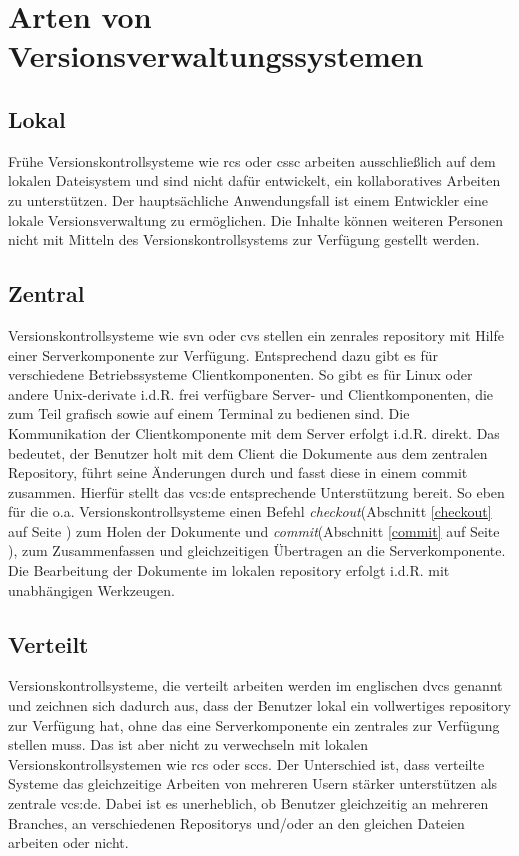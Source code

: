 \section{Arten von Versionsverwaltungssystemen}
\subsection{Lokal}\label{sec:local}
Frühe Versionskontrollsysteme wie \acrshort{rcs} oder \acrshort{cssc} arbeiten
ausschließlich auf dem lokalen Dateisystem und sind nicht dafür entwickelt, ein
kollaboratives Arbeiten zu unterstützen. Der hauptsächliche Anwendungsfall ist
einem Entwickler eine lokale Versionsverwaltung zu ermöglichen. Die Inhalte
können weiteren Personen nicht mit Mitteln des Versionskontrollsystems zur
Verfügung gestellt werden.

\subsection{Zentral}\label{sec:central}
Versionskontrollsysteme wie \acrshort{svn} oder \acrshort{cvs} stellen ein
zenrales \gls{repository} mit Hilfe einer Serverkomponente zur Verfügung.
Entsprechend dazu gibt es für verschiedene Betriebssysteme Clientkomponenten.
So gibt es für Linux oder andere Unix-derivate i.d.R. frei verfügbare Server-
und Clientkomponenten, die zum Teil grafisch sowie auf einem Terminal zu
bedienen sind. Die Kommunikation der Clientkomponente mit dem Server erfolgt
i.d.R. direkt. Das bedeutet, der Benutzer holt mit dem Client die Dokumente aus
dem zentralen Repository, führt seine Änderungen durch und fasst diese in einem
\gls{commit} zusammen. Hierfür stellt das \acrlong{vcs:de} entsprechende
Unterstützung bereit. So eben für die o.a. Versionskontrollsysteme einen Befehl
\textit{checkout}(Abschnitt \ref{checkout} auf Seite \pageref{checkout}) zum
Holen der Dokumente und \textit{commit}(Abschnitt \ref{commit} auf Seite
\pageref{commit}), zum Zusammenfassen und gleichzeitigen Übertragen an die
Serverkomponente. Die Bearbeitung der Dokumente im lokalen \gls{repository}
erfolgt i.d.R. mit unabhängigen Werkzeugen.\cite[S.~38-40]{hagen:1678}

\subsection{Verteilt}\label{sec:decentral}
Versionskontrollsysteme, die verteilt arbeiten werden im englischen
\acrfull{dvcs} genannt und zeichnen sich dadurch aus, dass der Benutzer lokal
ein vollwertiges \gls{repository} zur Verfügung hat, ohne das eine
Serverkomponente ein zentrales zur Verfügung stellen muss. Das ist aber nicht
zu verwechseln mit lokalen Versionskontrollsystemen wie \acrshort{rcs} oder
\acrshort{sccs}. Der Unterschied ist, dass verteilte Systeme das gleichzeitige
Arbeiten von mehreren Usern stärker unterstützen als zentrale
\acrshort{vcs:de}. Dabei ist es unerheblich, ob Benutzer gleichzeitig an
mehreren Branches, an verschiedenen Repositorys und/oder an den gleichen
Dateien arbeiten oder nicht.\cite[S.~393-394]{cd}

